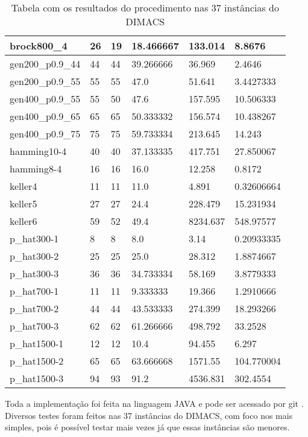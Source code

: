 \documentclass{article}
\begin{document}
\begin{center}
\begin{table}
\begin{tabular}{| l | l | l | l | l | l |}
brock800\_4			&	26			&19			&18.466667		&133.014	&8.8676\\ \hline
gen200\_p0.9\_44	&	44			&44			&39.266666		&36.969		&2.4646	\\ \hline
gen200\_p0.9\_55	&	55			&55			&47.0			&51.641		&3.4427333\\ \hline
gen400\_p0.9\_55	&	55			&50			&47.6			&157.595	&10.506333\\ \hline
gen400\_p0.9\_65	&	65			&65			&50.333332		&156.574	&10.438267\\ \hline
gen400\_p0.9\_75	&	75			&75			&59.733334		&213.645	&14.243\\ \hline
hamming10-4		&	40			&40			&37.133335		&417.751	&27.850067\\ \hline
hamming8-4			&	16			&16			&16.0			&12.258		&0.8172\\ \hline
keller4				&	11			&11			&11.0			&4.891		&0.32606664\\ \hline
keller5				&	27			&27			&24.4			&228.479	&15.231934\\ \hline
keller6				&	59			&52			&49.4			&8234.637	&548.97577\\ \hline
p\_hat300-1			&	8			&8 			&8.0			&3.14		&0.20933335\\ \hline
p\_hat300-2			&	25			&25			&25.0			&28.312		&1.8874667\\ \hline
p\_hat300-3			&	36			&36			&34.733334		&58.169		&3.8779333\\ \hline
p\_hat700-1			&	11			&11			&9.333333		&19.366		&1.2910666\\ \hline
p\_hat700-2			&	44			&44			&43.533333		&274.399	&18.293266\\ \hline
p\_hat700-3			&	62			&62			&61.266666		&498.792	&33.2528\\ \hline
p\_hat1500-1		&	12			&12			&10.4			&94.455		&6.297\\ \hline
p\_hat1500-2		&	65			&65			&63.666668		&1571.55	&104.770004\\ \hline
p\_hat1500-3		&	94			&93			&91.2			&4536.831	&302.4554\\ \hline
    \hline
\end{tabular}
\caption{Tabela com os resultados do procedimento nas 37 instâncias do DIMACS}
\end{table}
\end{center}

Toda a implementação foi feita na linguagem JAVA e pode ser acessado por git \cite{git}. Diversos testes foram feitos nas 37 instâncias do DIMACS, com foco nos mais simples, pois é possível testar mais vezes já que essas instâncias são menores.\par
\end{document}
